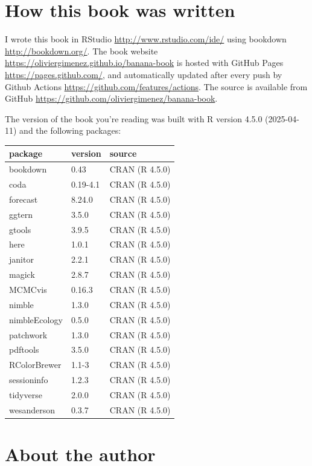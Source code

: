 \documentclass[
  12pt,
]{krantz}
\begin{document}
\section*{How this book was written}\label{how-this-book-was-written}


I wrote this book in RStudio \url{http://www.rstudio.com/ide/} using bookdown \url{http://bookdown.org/}. The book website \url{https://oliviergimenez.github.io/banana-book} is hosted with GitHub Pages \url{https://pages.github.com/}, and automatically updated after every push by Github Actions \url{https://github.com/features/actions}. The source is available from GitHub \url{https://github.com/oliviergimenez/banana-book}.

The version of the book you're reading was built with R version 4.5.0 (2025-04-11) and the following packages:

\begin{longtable}[]{@{}lll@{}}
\toprule\noalign{}
package & version & source \\
\midrule\noalign{}
\endhead
\bottomrule\noalign{}
\endlastfoot
bookdown & 0.43 & CRAN (R 4.5.0) \\
coda & 0.19-4.1 & CRAN (R 4.5.0) \\
forecast & 8.24.0 & CRAN (R 4.5.0) \\
ggtern & 3.5.0 & CRAN (R 4.5.0) \\
gtools & 3.9.5 & CRAN (R 4.5.0) \\
here & 1.0.1 & CRAN (R 4.5.0) \\
janitor & 2.2.1 & CRAN (R 4.5.0) \\
magick & 2.8.7 & CRAN (R 4.5.0) \\
MCMCvis & 0.16.3 & CRAN (R 4.5.0) \\
nimble & 1.3.0 & CRAN (R 4.5.0) \\
nimbleEcology & 0.5.0 & CRAN (R 4.5.0) \\
patchwork & 1.3.0 & CRAN (R 4.5.0) \\
pdftools & 3.5.0 & CRAN (R 4.5.0) \\
RColorBrewer & 1.1-3 & CRAN (R 4.5.0) \\
sessioninfo & 1.2.3 & CRAN (R 4.5.0) \\
tidyverse & 2.0.0 & CRAN (R 4.5.0) \\
wesanderson & 0.3.7 & CRAN (R 4.5.0) \\
\end{longtable}

\section*{About the author}\label{about-the-author}
\end{document}
